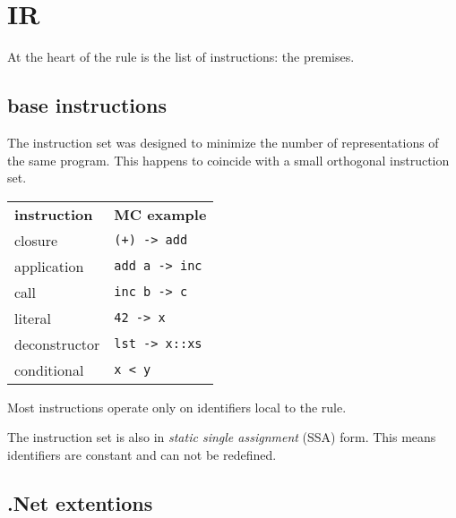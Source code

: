 \section{IR}
At the heart of the rule is the list of instructions: the premises.

\subsection{base instructions}
The instruction set was designed to minimize the number of representations of the same program.
This happens to coincide with a small orthogonal instruction set.

\begin{tabular}{ll}
    \textbf{instruction} & \textbf{MC example}\\
    closure       & \verb|(+) -> add| \\
    application   & \verb|add a -> inc| \\
    call          & \verb|inc b -> c| \\
    literal       & \verb|42 -> x|\\
    deconstructor & \verb|lst -> x::xs| \\
    conditional   & \verb|x < y| \\
\end{tabular}

Most instructions operate only on identifiers local to the rule.

The instruction set is also in \textit{static single assignment} (SSA) form.
This means identifiers are constant and can not be redefined.

\subsection{.Net extentions}

